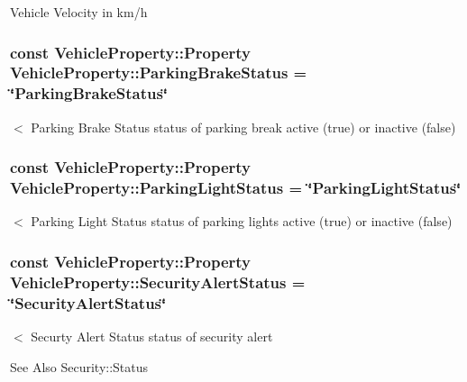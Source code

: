 Vehicle Velocity in km/h \hypertarget{classVehicleProperty_a848ad7334c7aa14709fe2e8c3a1b2608}{
\subsubsection[{Parking\-Brake\-Status}]{\setlength{\rightskip}{0pt plus 5cm}const Vehicle\-Property\-::\-Property Vehicle\-Property\-::\-Parking\-Brake\-Status = \char`\"{}Parking\-Brake\-Status\char`\"{}\hspace{0.3cm}{\ttfamily [static]}}}\label{classVehicleProperty_a848ad7334c7aa14709fe2e8c3a1b2608}
$<$ Parking Brake Status status of parking break active (true) or inactive (false) \hypertarget{classVehicleProperty_a505ffc37974f674df55a97c27a7ba0b7}{
\subsubsection[{Parking\-Light\-Status}]{\setlength{\rightskip}{0pt plus 5cm}const Vehicle\-Property\-::\-Property Vehicle\-Property\-::\-Parking\-Light\-Status = \char`\"{}Parking\-Light\-Status\char`\"{}\hspace{0.3cm}{\ttfamily [static]}}}\label{classVehicleProperty_a505ffc37974f674df55a97c27a7ba0b7}
$<$ Parking Light Status status of parking lights active (true) or inactive (false) \hypertarget{classVehicleProperty_a7bc28af663879a2ac9145e5b97a5da4f}{
\subsubsection[{Security\-Alert\-Status}]{\setlength{\rightskip}{0pt plus 5cm}const Vehicle\-Property\-::\-Property Vehicle\-Property\-::\-Security\-Alert\-Status = \char`\"{}Security\-Alert\-Status\char`\"{}\hspace{0.3cm}{\ttfamily [static]}}}\label{classVehicleProperty_a7bc28af663879a2ac9145e5b97a5da4f}
$<$ Securty Alert Status status of security alert \begin{DoxySeeAlso}{See Also}
Security\-::\-Status 
\end{DoxySeeAlso}

